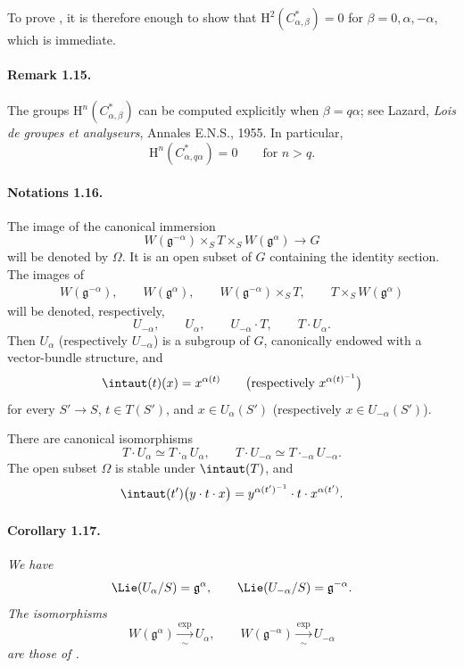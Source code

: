 To prove , it is therefore enough to show that
\(\mathrm H^2(C^\ast_{\alpha,\beta})=0\) for
\(\beta=0,\alpha,-\alpha\), which is immediate.

\paragraph{\textbf{Remark 1.15.}}
The groups \(\mathrm H^n(C^\ast_{\alpha,\beta})\) can be computed
explicitly when \(\beta=q\alpha\); see Lazard,
\emph{Lois de groupes et analyseurs}, Annales E.N.S., 1955. In
particular,
\[
  \mathrm H^n(C^\ast_{\alpha,q\alpha})=0
  \qquad\text{for \(n>q\).}
\]

\paragraph{\textbf{Notations 1.16.}}
The image of the canonical immersion
\[
  W(\mathfrak g^{-\alpha})\times_S T
    \times_S W(\mathfrak g^\alpha)\longrightarrow G
\]
will be denoted by \(\Omega\). It is an open subset of \(G\)
containing the identity section. The images of
\[
\begin{gathered}
  W(\mathfrak g^{-\alpha}),\qquad W(\mathfrak g^\alpha),\qquad
  W(\mathfrak g^{-\alpha})\times_S T,\qquad
  T\times_S W(\mathfrak g^\alpha)
\end{gathered}
\]
will be denoted, respectively,
\[
  U_{-\alpha},\qquad U_\alpha,\qquad
  U_{-\alpha}\mathbin{\cdot}T,\qquad T\mathbin{\cdot}U_\alpha.
\]
Then \(U_\alpha\) (respectively \(U_{-\alpha}\)) is a subgroup of
\(G\), canonically endowed with a vector-bundle structure, and
\[
  \intaut(t)(x)=x^{\alpha(t)}
  \qquad
  \bigl(\text{respectively }x^{\alpha(t)^{-1}}\bigr)
\]
for every \(S'\to S\), \(t\in T(S')\), and
\(x\in U_\alpha(S')\) (respectively \(x\in U_{-\alpha}(S')\)).

There are canonical isomorphisms
\[
  T\mathbin{\cdot}U_\alpha\simeq T\mathbin{\cdot_\alpha}U_\alpha,
  \qquad
  T\mathbin{\cdot}U_{-\alpha}
    \simeq T\mathbin{\cdot_{-\alpha}}U_{-\alpha}.
\]
The open subset \(\Omega\) is stable under \(\intaut(T)\), and
\[
  \intaut(t')\bigl(y\mathbin{\cdot}t\mathbin{\cdot}x\bigr)
    =y^{\alpha(t')^{-1}}\mathbin{\cdot}t
       \mathbin{\cdot}x^{\alpha(t')}.
\]

\paragraph{\textbf{Corollary 1.17.}}
\emph{We have}
\[
  \Lie(U_\alpha/S)=\mathfrak g^\alpha,\qquad
  \Lie(U_{-\alpha}/S)=\mathfrak g^{-\alpha}.
\]
\emph{The isomorphisms}
\[
  W(\mathfrak g^\alpha)\xrightarrow[\sim]{\exp}U_\alpha,
  \qquad
  W(\mathfrak g^{-\alpha})\xrightarrow[\sim]{\exp}U_{-\alpha}
\]
\emph{are those of .}


